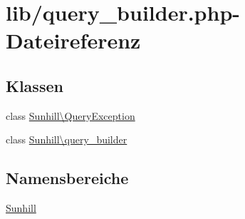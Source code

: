 \hypertarget{query__builder_8php}{}\section{lib/query\+\_\+builder.php-\/\+Dateireferenz}
\label{query__builder_8php}
\subsection*{Klassen}
\begin{DoxyCompactItemize}
\item 
class \hyperlink{classSunhill_1_1QueryException}{Sunhill\textbackslash{}\+Query\+Exception}
\item 
class \hyperlink{classSunhill_1_1query__builder}{Sunhill\textbackslash{}query\+\_\+builder}
\end{DoxyCompactItemize}
\subsection*{Namensbereiche}
\begin{DoxyCompactItemize}
\item 
 \hyperlink{namespaceSunhill}{Sunhill}
\end{DoxyCompactItemize}
